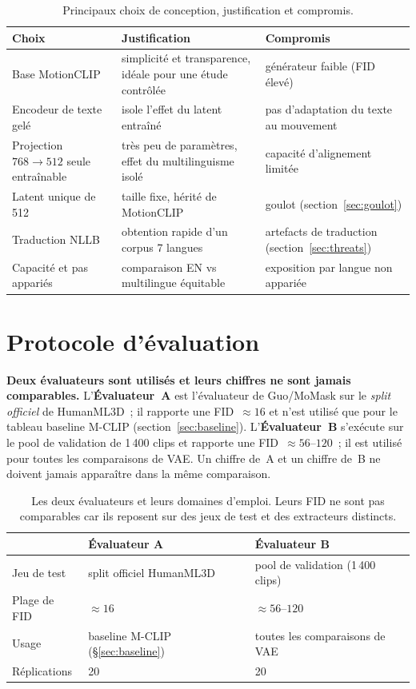 \documentclass[12pt,a4paper,oneside]{report}
\theoremstyle{definition}
\theoremstyle{plain}
\begin{document}
\begin{table}[ht]
\centering
\caption{Principaux choix de conception, justification et compromis.}
\label{tab:choix}
\small
\begin{tabular}{@{}p{3.3cm}p{5.4cm}p{4.2cm}@{}}
\toprule
\textbf{Choix} & \textbf{Justification} & \textbf{Compromis} \\
\midrule
Base MotionCLIP & simplicité et transparence, idéale pour une étude contrôlée &
générateur faible (FID élevé) \\
Encodeur de texte gelé & isole l'effet du latent entraîné &
pas d'adaptation du texte au mouvement \\
Projection $768{\to}512$ seule entraînable & très peu de paramètres, effet du
multilinguisme isolé & capacité d'alignement limitée \\
Latent unique de 512 & taille fixe, hérité de MotionCLIP &
goulot (section~\ref{sec:goulot}) \\
Traduction NLLB & obtention rapide d'un corpus 7 langues &
artefacts de traduction (section~\ref{sec:threats}) \\
Capacité et pas appariés & comparaison EN vs multilingue équitable &
exposition par langue non appariée \\
\bottomrule
\end{tabular}
\end{table}

\section{Protocole d'évaluation}
\label{sec:protocole}

\begin{encadre}
\textbf{Deux évaluateurs sont utilisés et leurs chiffres ne sont jamais
comparables.} L'\textbf{Évaluateur~A} est l'évaluateur de Guo/MoMask sur le
\emph{split officiel} de HumanML3D~; il rapporte une FID~$\approx 16$ et n'est
utilisé que pour le tableau baseline M-CLIP (section~\ref{sec:baseline}).
L'\textbf{Évaluateur~B} s'exécute sur le pool de validation de 1\,400 clips et
rapporte une FID~$\approx 56$--$120$~; il est utilisé pour toutes les
comparaisons de VAE. Un chiffre de~A et un chiffre de~B ne doivent jamais
apparaître dans la même comparaison.
\end{encadre}

\begin{table}[ht]
\centering
\caption{Les deux évaluateurs et leurs domaines d'emploi. Leurs FID ne sont pas
comparables car ils reposent sur des jeux de test et des extracteurs distincts.}
\label{tab:evals}
\small
\begin{tabular}{@{}lll@{}}
\toprule
 & \textbf{Évaluateur A} & \textbf{Évaluateur B} \\
\midrule
Jeu de test & split officiel HumanML3D & pool de validation (1\,400 clips) \\
Plage de FID & $\approx 16$ & $\approx 56$--$120$ \\
Usage & baseline M-CLIP (\S\ref{sec:baseline}) & toutes les comparaisons de VAE \\
Réplications & 20 & 20 \\
\bottomrule
\end{tabular}
\end{table}
\end{document}
